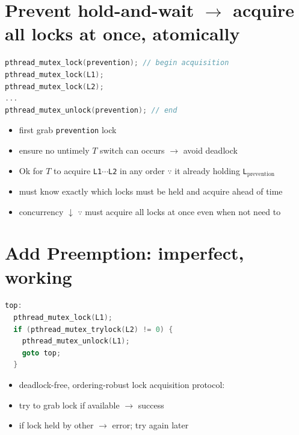 \section*{Prevent hold-and-wait $\to$ acquire all locks at once, atomically}
\begin{minipage}{0.75\linewidth}
\begin{lstlisting}[language=c,xleftmargin=2pt]
pthread_mutex_lock(prevention); // begin acquisition
pthread_mutex_lock(L1);
pthread_mutex_lock(L2);
...
pthread_mutex_unlock(prevention); // end
\end{lstlisting}
\end{minipage}
\begin{minipage}{0.3\linewidth}
  \flushleft
  \begin{itemize}
  \item {} first grab \texttt{prevention} lock
  \item ensure no untimely $T$ switch can occurs $\to$ avoid deadlock
  \end{itemize}
\end{minipage}
\begin{itemize}
\item Ok for $T$ to acquire \texttt{L1}$\cdots$\texttt{L2} in any order $\because$ it already holding \texttt{L}$_\text{prevention}$
\item must know exactly which locks must be held and acquire ahead of time
\item concurrency $\downarrow$ $\because$ must acquire all locks at once even when not need to
\end{itemize}
\begin{minipage}{0.56\linewidth}
\section*{Add Preemption: imperfect, working}
\begin{lstlisting}[language=c,xleftmargin=2pt]
top:
  pthread_mutex_lock(L1);
  if (pthread_mutex_trylock(L2) != 0) {
    pthread_mutex_unlock(L1);
    goto top;
  }
\end{lstlisting}
\end{minipage}
\begin{minipage}{0.44\linewidth}
  \flushleft
  \begin{itemize}
  \item deadlock-free, ordering-robust lock acquisition protocol:
  \item try to grab lock if available $\to$ success
  \item if lock held by other $\to$ error; try again later
  \end{itemize}
\end{minipage}
